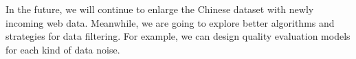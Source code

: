 \documentclass{article}
\begin{document}
In the future, we will continue to enlarge the Chinese dataset with newly incoming web data. Meanwhile, we are going to explore better algorithms and strategies for data filtering. For example, we can design quality evaluation models for each kind of data noise.









\end{document}
